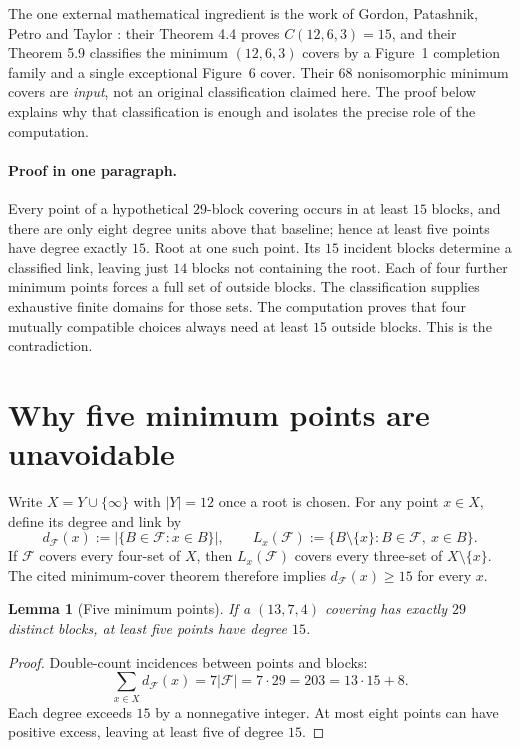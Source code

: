 \documentclass[11pt]{article}
\newcommand{\coverfam}{\mathcal F}
\newtheorem{lemma}[theorem]{Lemma}
\theoremstyle{definition}
\theoremstyle{remark}
\begin{document}
The one external mathematical ingredient is the work of Gordon,
Patashnik, Petro and Taylor \cite{GPPT}: their Theorem 4.4 proves
$C(12,6,3)=15$, and their Theorem 5.9 classifies the minimum
$(12,6,3)$ covers by a Figure~1 completion family and a single
exceptional Figure~6 cover. Their $68$ nonisomorphic minimum covers
are \emph{input}, not an original classification claimed here.
The proof below explains why that classification is enough and
isolates the precise role of the computation.

\paragraph{Proof in one paragraph.}
Every point of a hypothetical $29$-block covering occurs in at least
$15$ blocks, and there are only eight degree units above that baseline;
hence at least five points have degree exactly $15$. Root at one such
point. Its $15$ incident blocks determine a classified link, leaving
just $14$ blocks not containing the root. Each of four further minimum
points forces a full set of outside blocks. The classification supplies
exhaustive finite domains for those sets. The computation proves that
four mutually compatible choices always need at least $15$ outside
blocks. This is the contradiction.

\section{Why five minimum points are unavoidable}
Write $X=Y\cup\{\infty\}$ with $|Y|=12$ once a root is chosen.
For any point $x\in X$, define its degree and link by
\[
 d_\coverfam(x):=|\{B\in\coverfam:x\in B\}|,\qquad
 L_x(\coverfam):=\{B\setminus\{x\}:B\in\coverfam,\ x\in B\}.
\]
If $\coverfam$ covers every four-set of $X$, then $L_x(\coverfam)$ covers every
three-set of $X\setminus\{x\}$. The cited minimum-cover theorem
therefore implies $d_\coverfam(x)\geq15$ for every $x$.

\begin{lemma}[Five minimum points]\label{lem:five}
If a $(13,7,4)$ covering has exactly $29$ distinct blocks, at least
five points have degree $15$.
\end{lemma}
\begin{proof}
Double-count incidences between points and blocks:
\[
 \sum_{x\in X}d_\coverfam(x)=7|\coverfam|=7\cdot29=203
 =13\cdot15+8.
\]
Each degree exceeds $15$ by a nonnegative integer. At most eight
points can have positive excess, leaving at least five of degree $15$.
\end{proof}
\end{document}
